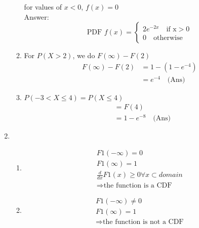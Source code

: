 \documentclass[a4paper, 12pt]{article}
\begin{document}
\begin{enumerate}
\begin{enumerate}
		for values of $x < 0$, $f(x) = 0$\\
		Answer:
		\[
			\text{PDF }f(x) = 
			\begin{cases}
				2e^{-2x} \quad \text{if x} > 0\\
				0 \quad \text{otherwise}
			\end{cases}
		\]
			
		\item For $P(X>2)$, we do $F(\infty)-F(2)$
		\begin{align*}
			F(\infty) - F(2) &= 1 - \left(1-e^{-4}\right)\\
			&= e^{-4} \quad\text{(Ans)}
		\end{align*}
			
		\item $P(-3<X\leq4) = P(X\leq4)$
		\begin{align*}
		&= F(4)\\
		&= 1 - e^{-8} \quad\text{(Ans)}
		\end{align*}
		
	\end{enumerate}

	\item 
		\begin{enumerate}
			\item 
			\begin{align*}
				F1(-\infty) = 0\\
				F1(\infty) = 1\\
				\frac{d}{dx} F1(x) \geq 0 \forall x \subset domain\\
				\Rightarrow \textrm{the function is a CDF}
			\end{align*}
			\item 
			\begin{align*}
				F1(-\infty) \neq 0\\
				F1(\infty) = 1\\
				\Rightarrow \textrm{the function is not a CDF}
			\end{align*}
		\end{enumerate}


\end{enumerate}
\end{document}
